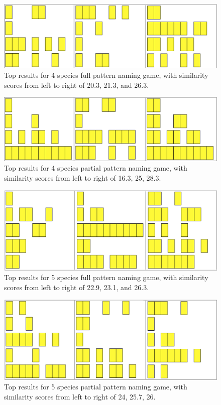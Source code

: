 \begin{figure}[h]
\includegraphics[width = \columnwidth]{./pictures/4_lcs_one/all.png}
\caption{Top results for 4 species full pattern naming game, with similarity scores from left to right of 20.3, 21.3, and 26.3.}
\end{figure} 

\begin{figure}[h]
\includegraphics[width = \columnwidth]{./pictures/4_lcs_two/all.png}
\caption{Top results for 4 species partial pattern naming game, with similarity scores from left to right of 16.3, 25, 28.3.}
\end{figure} 

\begin{figure}[h]
\includegraphics[width = \columnwidth]{./pictures/5_lcs_one/all.png}
\caption{Top results for 5 species full pattern naming game, with similarity scores from left to right of 22.9, 23.1, and 26.3.}
\end{figure} 

\begin{figure}[h]
\includegraphics[width = \columnwidth]{./pictures/5_lcs_two/all.png}
\caption{Top results for 5 species partial pattern naming game, with similarity scores from left to right of 24, 25.7, 26.}
\end{figure}  

